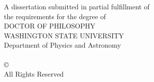 \thispagestyle{empty}
\begin{center}
  {\doublespacing\MakeUppercase{\thesistitle}\par}
  \vfill
  \MakeUppercase{\thesisauthor}\par
  \vfill\vfill
  {\singlespacing
  A dissertation submitted in partial fulfillment of\\
  the requirements for the degree of\\[\baselineskip]
  DOCTOR OF PHILOSOPHY\\[2\baselineskip]
  WASHINGTON STATE UNIVERSITY\\
  Department of Physics and Astronomy\\[2\baselineskip]
  \MakeUppercase{\thesisdate}\\[3\baselineskip]
  \copyright\ \thesisyear\ \MakeUppercase{\thesisauthor}\\
  All Rights Reserved\par}
\end{center}
\clearpage
